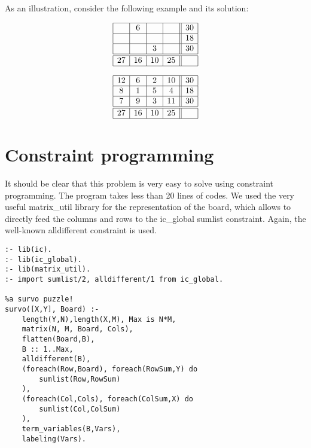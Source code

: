 \documentclass[a4paper,11pt,english]{article}
\begin{document}
As an illustration, consider the following example and its solution:

\begin{minipage}{0.5\textwidth}
\[
\begin{array}{ |c | c | c | c || c | } \hline
 	 &	6 &	&	&	30\\\hline
 	& 	&	&	&	18\\\hline
	 &	&	3 	&	&30\\ \hline\hline
	27 &	16 &	10 	&25 & \\	\hline
\end{array}
\]
\end{minipage}
\hfill
\begin{minipage}{0.5\textwidth}
\[
\begin{array}{ |c | c | c | c || c | } \hline
	12 &	6 &	2 &	10 &	30 \\\hline
	8 &	1 &	5 &	4 &	18\\\hline
	7 &	9 &	3 &	11 &	30\\\hline\hline
	27 &	16 &	10 &	25 &	\\\hline
\end{array}
\]
\end{minipage}

\section{Constraint programming}
It should be clear that this problem is very easy to solve using constraint programming. The program takes less than 20 lines of codes. We used the very useful matrix\_util library for the representation of the board, which allows to directly feed the columns and rows to the ic\_global sumlist constraint. Again, the well-known alldifferent constraint is used.

\begin{lstlisting}
:- lib(ic).
:- lib(ic_global).
:- lib(matrix_util).
:- import sumlist/2, alldifferent/1 from ic_global.

%a survo puzzle!
survo([X,Y], Board) :-
	length(Y,N),length(X,M), Max is N*M,
	matrix(N, M, Board, Cols),
	flatten(Board,B),
	B :: 1..Max, 
	alldifferent(B),
	(foreach(Row,Board), foreach(RowSum,Y) do
		sumlist(Row,RowSum)
	),
	(foreach(Col,Cols), foreach(ColSum,X) do
		sumlist(Col,ColSum)
	),
	term_variables(B,Vars),
	labeling(Vars).
\end{lstlisting}
\end{document}
